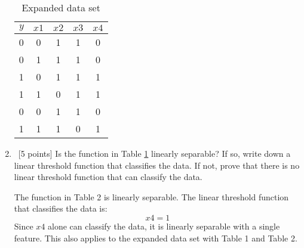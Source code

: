 \begin{enumerate}
  \begin{table}[h]
    \centering
    \begin{tabular}{ccccc}
      \toprule
      $y$ & $x1$ & $x2$ & $x3$ & $x4$ \\
      \midrule
      0 & 0    & 1    & 1    & 0    \\
      0 & 1    & 1    & 1    & 0    \\
      1 & 0    & 1    & 1    & 1    \\
      1 & 1    & 0    & 1    & 1    \\
      0 & 0    & 1    & 1    & 0    \\
      1 & 1    & 1    & 0    & 1    \\
      \bottomrule
    \end{tabular}
    \caption{Expanded data set}
    \label{tab:boolean-function-data-2}
  \end{table}

\item ~[5 points] Is the function in Table
  \ref{tab:boolean-function-data-2} linearly separable? If so, write
  down a linear threshold function that classifies the data. If not,
  prove that there is no linear threshold function that can classify
  the data.

  {\color{red}
    The function in Table 2 is linearly separable. The linear threshold function that classifies the data is:
    $$
    x4 = 1
    $$
    Since $x4$ alone can classify the data, it is linearly separable with a single feature. This also applies to the expanded data set with Table 1 and Table 2.
  }

\end{enumerate}

